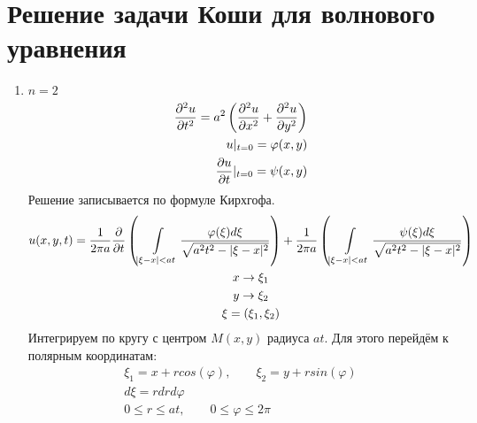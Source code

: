 \documentclass[../main.tex]{subfiles}
\begin{document}
\section{Решение задачи Коши для волнового уравнения}
\begin{enumerate}
	\item $n=2$
	      \begin{equation}
		      \label{eq:2.7.1}
		      \begin{split}
			      \frac{\partial ^2u}{\partial t^2} = a^2\left(\frac{\partial ^2u}{\partial x^2}+\frac{\partial ^2u}{\partial y^2}\right)\\
			      u|_{t=0} = \varphi(x,y)\\
			      \frac{\partial u}{\partial t}|_{t=0} = \psi(x,y)
		      \end{split}
	      \end{equation}
	      Решение записывается по формуле Кирхгофа.
	      \begin{gather*}
		      u(x,y,t) = \frac{1}{2\pi a}\frac{\partial  }{\partial t}\left(
		      \int\displaylimits_{|\xi-x|<at} \frac{\varphi(\xi)d\xi}{\sqrt{a^2t^2 - |\xi-x|^2}}\right)
		      +
		      \frac{1}{2\pi a}\left(
		      \int\displaylimits_{|\xi-x|<at} \frac{\psi(\xi)d\xi}{\sqrt{a^2t^2 - |\xi-x|^2}}\right)\\
		      x \rightarrow \xi_1\\
		      y \rightarrow \xi_2\\
		      \xi = (\xi_1,\xi_2)
	      \end{gather*}
	      Интегрируем по кругу с центром $M(x,y)$ радиуса $at$. Для этого перейдём к
	      полярным координатам:
	      \begin{gather*}
		      \xi_1 = x + r cos(\varphi), \qquad \xi_2 = y + r sin(\varphi)\\
		      d\xi = r dr d\varphi \\
		      0 \leq r \leq at, \qquad 0 \leq \varphi \leq 2\pi
	      \end{gather*}


\end{enumerate}
\end{document}
